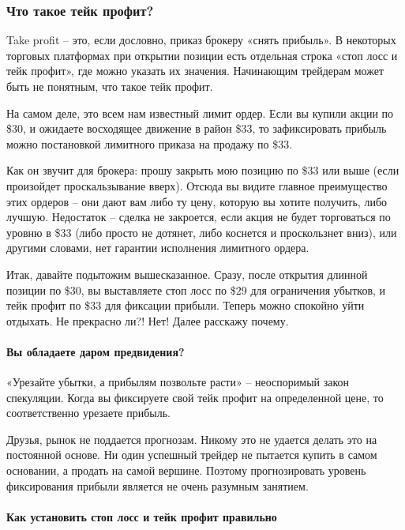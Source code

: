 \documentclass[a5paper]{article}
\begin{document}
\subsubsection{Что такое тейк профит?}

Take profit – это, если дословно, приказ брокеру «снять прибыль». В некоторых торговых платформах при открытии позиции есть отдельная строка «стоп лосс и тейк профит», где можно указать их значения. Начинающим трейдерам может быть не понятным, что такое тейк профит.

На самом деле, это всем нам известный лимит ордер. Если вы купили акции по \$30, и ожидаете восходящее движение в район \$33, то зафиксировать прибыль можно постановкой лимитного приказа на продажу по \$33.

Как он звучит для брокера: прошу закрыть мою позицию по \$33 или выше (если произойдет проскальзывание вверх). Отсюда вы видите главное преимущество этих ордеров – они дают вам либо ту цену, которую вы хотите получить, либо лучшую. Недостаток – сделка не закроется, если акция не будет торговаться по уровню в \$33 (либо просто не дотянет, либо коснется и проскользнет вниз), или другими словами, нет гарантии исполнения лимитного ордера.

Итак, давайте подытожим вышесказанное. Сразу, после открытия длинной
позиции по \$30, вы выставляете стоп лосс по \$29 для ограничения
убытков, и тейк профит по \$33 для фиксации прибыли. Теперь можно
спокойно уйти отдыхать. Не прекрасно ли?! Нет! Далее расскажу почему.

\paragraph{Вы обладаете даром предвидения?}

«Урезайте убытки,  а прибылям позвольте расти» – неоспоримый закон спекуляции. Когда вы фиксируете свой тейк профит на определенной цене, то соответственно урезаете прибыль.

Друзья, рынок не поддается прогнозам. Никому это не удается делать это
на постоянной основе. Ни один успешный трейдер не пытается купить в
самом основании, а продать на самой вершине. Поэтому прогнозировать
уровень фиксирования прибыли является не очень разумным занятием.

\paragraph{Как установить стоп лосс и тейк профит правильно}
\end{document}
